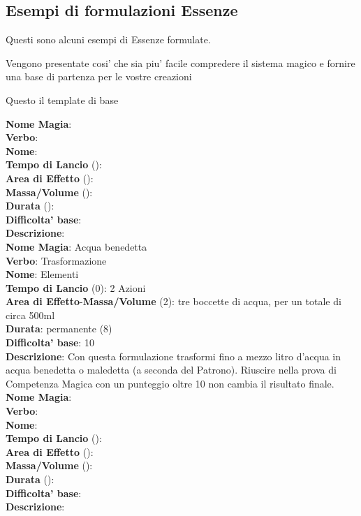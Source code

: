 \subsection{Esempi di formulazioni Essenze}

Questi sono alcuni esempi di Essenze formulate.

Vengono presentate cosi' che sia piu' facile compredere il sistema magico e fornire una base di partenza per le vostre creazioni


Questo il template di base


\flushleft \textbf{Nome Magia}: \\ 
\textbf{Verbo}: \\
\textbf{Nome}: \\
\textbf{Tempo di Lancio} (): \\
\textbf{Area di Effetto} (): \\
\textbf{Massa/Volume} (): \\
\textbf{Durata} (): \\
\textbf{Difficolta' base}: \\
\textbf{Descrizione}: \\


\flushleft \textbf{Nome Magia}: Acqua benedetta\\  
\textbf{Verbo}: Trasformazione\\
\textbf{Nome}: Elementi\\
\textbf{Tempo di Lancio} (0): 2 Azioni\\
\textbf{Area di Effetto}-\textbf{Massa/Volume} (2): tre boccette di acqua, per un totale di circa 500ml\\
\textbf{Durata}: permanente (8)\\
\textbf{Difficolta' base}: 10\\
\textbf{Descrizione}: Con questa formulazione trasformi fino a mezzo litro d'acqua in acqua benedetta o maledetta (a seconda del Patrono). Riuscire nella prova di Competenza Magica con un punteggio oltre 10 non cambia il risultato finale.\\


\flushleft \textbf{Nome Magia}: \\ 
\textbf{Verbo}: \\
\textbf{Nome}: \\
\textbf{Tempo di Lancio} (): \\
\textbf{Area di Effetto} (): \\
\textbf{Massa/Volume} (): \\
\textbf{Durata} (): \\
\textbf{Difficolta' base}: \\
\textbf{Descrizione}: \\

